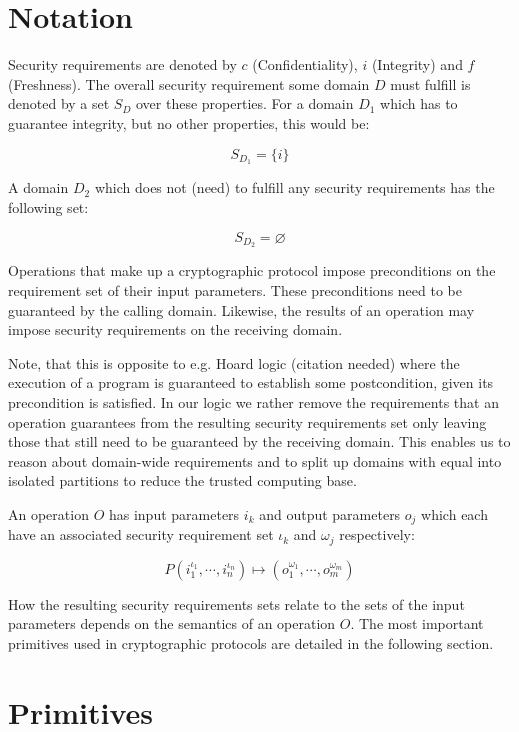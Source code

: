 \documentclass[a4paper]{article}
\newcommand{\emptysec}{\varnothing}
\begin{document}
\section{\label{sec:notation}Notation}

Security requirements are denoted by $c$ (Confidentiality), $i$ (Integrity) and
$f$ (Freshness). The overall security requirement some domain $D$ must fulfill
is denoted by a set $S_D$ over these properties. For a domain $D_1$ which has
to guarantee integrity, but no other properties, this would be:

$$S_{D_1} = \{i\}$$

A domain $D_2$ which does not (need) to fulfill any security requirements has
the following set:

$$S_{D_2} = \emptysec$$

Operations that make up a cryptographic protocol impose preconditions on the
requirement set of their input parameters. These preconditions need to be
guaranteed by the calling domain. Likewise, the results of an operation may
impose security requirements on the receiving domain.

Note, that this is opposite to e.g. Hoard logic (citation needed) where the
execution of a program is guaranteed to establish some postcondition, given its
precondition is satisfied. In our logic we rather remove the requirements that
an operation guarantees from the resulting security requirements set only
leaving those that still need to be guaranteed by the receiving domain. This
enables us to reason about domain-wide requirements and to split up domains
with equal into isolated partitions to reduce the trusted computing base.

An operation $O$ has input parameters $i_k$ and output parameters $o_j$ which
each have an associated security requirement set $\iota_k$ and $\omega_j$
respectively:

$$P(i_1^{\iota_1}, \cdots, i_n^{\iota_n}) \mapsto (o_1^{\omega_1}, \cdots, o_m^{\omega_m})$$

How the resulting security requirements sets relate to the sets of the input
parameters depends on the semantics of an operation $O$. The most important
primitives used in cryptographic protocols are detailed in the following
section.


\section{Primitives}
\end{document}
